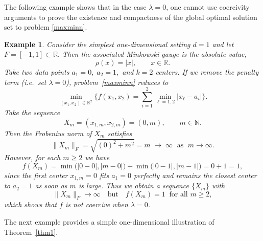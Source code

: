 \documentclass[11pt]{article}
\newtheorem{example}[theorem]{Example}
\theoremstyle{definition}
\newcommand{\1}{\mathbf{1}}
\begin{document}
The following example shows that in the case $\lambda=0$, one cannot use coercivity
arguments to prove the existence and compactness of the global optimal
solution set to problem \eqref{maxminn}. 

\begin{example}{\rm 
Consider the simplest one-dimensional setting $d=1$ and let $F = [-1,1]\subset\mathbb{R}.$
Then the associated Minkowski gauge is the absolute value,
\[
\rho(x)=|x|,\qquad x\in\mathbb{R}.
\]
Take two data points $a_1=0,\; a_2=1,$
and $k=2$ centers. If we remove the penalty term (i.e.\ set $\lambda=0$),
problem~\eqref{maxminn} reduces to
\[
\min_{(x_1,x_2)\in\mathbb{R}^2}\Big\{f(x_1,x_2)
=\sum_{i=1}^2 \min_{\ell=1,2} |x_\ell-a_i|\Big\}.\]
Take the sequence
\[
X_m = (x_{1,m},x_{2,m}) = (0,m),\qquad m\in\mathbb{N}.
\]
Then the Frobenius norm of $X_m$ satisfies
\[
\|X_m\|_F = \sqrt{(0)^2 + m^2} = m \;\to\; \infty
\;\text{ as }\; m\to\infty.
\]
However, for each $m\geq 2$ we have
\[
f(X_m)
=
\min\big(|0-0|,|m-0|\big)
+
\min\big(|0-1|,|m-1|\big)
=
0 + 1
= 1,
\]
since the first center $x_{1,m}=0$ fits $a_1=0$ perfectly and remains the closest
center to $a_2=1$ as soon as $m$ is large.
Thus we obtain a sequence $\{X_m\}$ with
\[
\|X_m\|_F\to\infty
\quad\text{but}\quad
f(X_m)=1\ \text{ for all } m\geq 2,
\]
which shows that $f$ is \emph{not} coercive when $\lambda=0$.}
\end{example}

The next example provides a simple one-dimensional illustration of Theorem~\ref{thm1}. 
\end{document}

